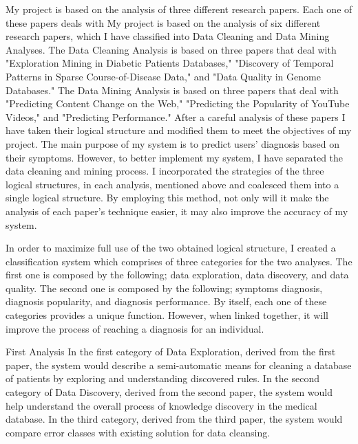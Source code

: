 \documentclass{sig-alternate}
\begin{document}
My project is based on the analysis of three different research papers. Each one of these papers deals with My project is based on the analysis of six different research papers, which I have classified into Data Cleaning and Data Mining Analyses. The Data Cleaning Analysis is based on three papers that deal with "Exploration Mining in Diabetic Patients Databases," "Discovery of Temporal Patterns in Sparse Course-of-Disease Data," and "Data Quality in Genome Databases." The Data Mining Analysis is based on three papers that deal with "Predicting Content Change on the Web," "Predicting the Popularity of YouTube Videos," and "Predicting Performance." After a careful analysis of these papers I have taken their logical structure and modified them to meet the objectives of my project. The main purpose of my system is to predict users' diagnosis based on their symptoms. However, to better implement my system, I have separated the data cleaning and mining process. I incorporated the strategies of the three logical structures, in each analysis, mentioned above and coalesced them into a single logical structure. By employing this method, not only will it make the analysis of each paper's technique easier, it may also improve the accuracy of my system.\newline

In order to maximize full use of the two obtained logical structure, I created a classification system which comprises of three categories for the two analyses. The first one is composed by the following; data exploration, data discovery, and data quality. The second one is composed by the following; symptoms diagnosis, diagnosis popularity, and diagnosis performance. By itself, each one of these categories provides a unique function. However, when linked together, it will improve the process of reaching a diagnosis for an individual.\newline 

First Analysis\newline
In the first category of Data Exploration, derived from the first paper, the system would describe a semi-automatic means for cleaning a database of patients by exploring and understanding discovered rules. In the second category of Data Discovery, derived from the second paper, the system  would help understand the overall process of knowledge discovery in the medical database. In the third category, derived from the third paper, the system would compare error classes with existing solution  for data cleansing.\newline 
\end{document}
